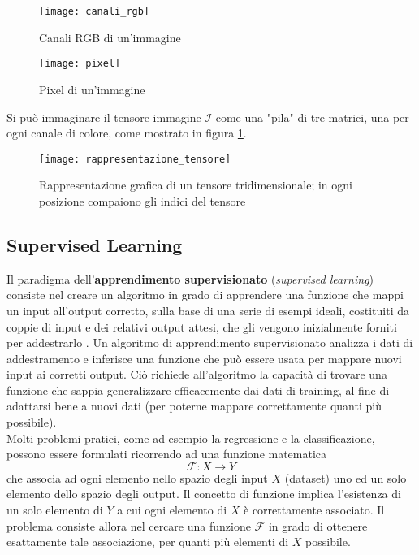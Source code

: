 \begin{figure}
  \begin{minipage}[b]{0.46\textwidth}
    \texttt{[image: canali\_rgb]}
    \caption{Canali RGB di un'immagine}
  \end{minipage}
  \hfill
  \begin{minipage}[b]{0.46\textwidth}
    \texttt{[image: pixel]}
    \caption{Pixel di un'immagine}
  \end{minipage}
\end{figure}

Si può immaginare il tensore immagine $\mathcal{I}$ come una "pila" di tre matrici, una per ogni canale di colore, come mostrato in figura \ref{rappresentazione_tensore}.

\begin{figure}
\centering
\texttt{[image: rappresentazione\_tensore]}
\caption{Rappresentazione grafica di un tensore tridimensionale; in ogni posizione compaiono gli indici del tensore}
\label{rappresentazione_tensore}
\end{figure}

\subsection{Supervised Learning}

Il paradigma dell'\textbf{apprendimento supervisionato} (\textit{supervised learning})
consiste nel creare un algoritmo in grado di apprendere una funzione che mappi un input all'output corretto, sulla base di una serie di esempi ideali, costituiti da coppie di input e dei relativi output attesi, che gli vengono inizialmente forniti per addestrarlo \cite{Russell2009}.
Un algoritmo di apprendimento supervisionato analizza i dati di addestramento e inferisce una funzione che può essere usata per mappare nuovi input ai corretti output. Ciò richiede all'algoritmo la capacità di trovare una funzione che sappia generalizzare efficacemente dai dati di training, al fine di adattarsi bene a nuovi dati (per poterne mappare correttamente quanti più possibile).\\

Molti problemi pratici, come ad esempio la regressione e la classificazione, possono essere formulati ricorrendo ad una funzione matematica
\[\mathcal{F}:X\to Y\]
che associa ad ogni elemento nello spazio degli input $X$ (dataset) uno ed un solo elemento dello spazio degli output.
Il concetto di funzione implica l'esistenza di un solo elemento di $Y$ a cui ogni elemento di $X$ è correttamente associato. Il problema consiste allora nel cercare una funzione $\mathcal{F}$ in grado di ottenere esattamente tale associazione, per quanti più elementi di $X$ possibile.

